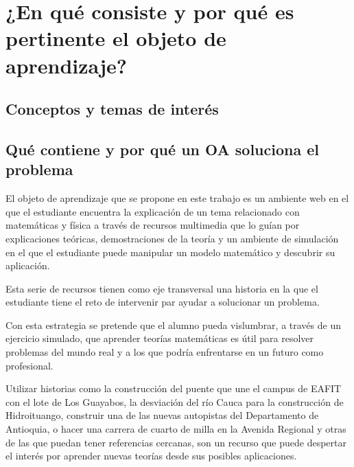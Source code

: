 \documentclass[twoside,letterpaper,12pt]{report}
\begin{document}

\section{¿En qué consiste y por qué es pertinente el objeto de aprendizaje?} %
\label{sec:_en_qu_consiste_y_por_qu_es_pertinente_el_objeto_de_aprendizaje_}

\subsection{Conceptos y temas de interés} %
\label{sub:conceptos_y_temas_de_inter_s}


\subsection{Qué contiene y por qué un OA soluciona el problema} %
\label{sub:qu_contiene_y_por_qu_un_oa_soluciona_el_problema}

El objeto de aprendizaje que se propone en este trabajo es un ambiente web en el que el estudiante encuentra la explicación de un tema relacionado con matemáticas y física a través de recursos multimedia que lo guían por explicaciones teóricas, demostraciones de la teoría y un ambiente de simulación en el que el estudiante puede manipular un modelo matemático y descubrir su aplicación.

Esta serie de recursos tienen como eje transversal una historia en la que el estudiante tiene el reto de intervenir par ayudar a solucionar un problema.

Con esta estrategia se pretende que el alumno pueda vislumbrar, a través de un ejercicio simulado, que aprender teorías matemáticas es útil para resolver problemas del mundo real y a los que podría enfrentarse en un futuro como profesional.

Utilizar historias como la construcción del puente que une el campus de EAFIT con el lote de Los Guayabos, la desviación del río Cauca para la construcción de Hidroituango, construir una de las nuevas autopistas del Departamento de Antioquia, o hacer una carrera de cuarto de milla en la Avenida Regional y otras de las que puedan tener referencias cercanas, son un recurso que puede despertar el interés por aprender nuevas teorías desde sus posibles aplicaciones.  

\end{document}
